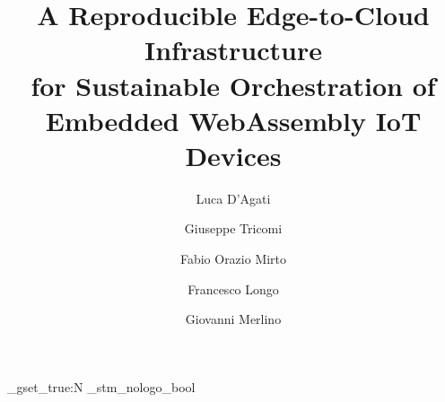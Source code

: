 \documentclass[a4paper,fleqn]{cas-dc}
\begin{document}
\let\WriteBookmarks\relax
\setcounter{topnumber}{4}
\setcounter{dbltopnumber}{3}
\renewcommand{\topfraction}{0.9}
\renewcommand{\bottomfraction}{0.8}
\renewcommand{\textfraction}{0.08}
\renewcommand{\floatpagefraction}{0.75}


\title[mode=title]{\texorpdfstring{A Reproducible Edge-to-Cloud Infrastructure\\ for Sustainable Orchestration of Embedded WebAssembly IoT Devices}{A Reproducible Edge-to-Cloud Infrastructure for Sustainable Orchestration of Embedded WebAssembly IoT Devices}}

\author[unime]{Luca D'Agati}\cormark[1]

\author[unime]{Giuseppe Tricomi}
\author[unime]{Fabio Orazio Mirto}
\author[unime,cini]{Francesco Longo}
\author[unime,cini]{Giovanni Merlino}
\address[unime]{Department of Engineering, University of Messina, Messina, Italy}
\address[cini]{CINI: National Interuniversity Consortium for Informatics, Rome, Italy}





\ExplSyntaxOn
\bool_gset_true:N \g_stm_nologo_bool
\ExplSyntaxOff
\maketitle












\FloatBarrier


\end{document}
